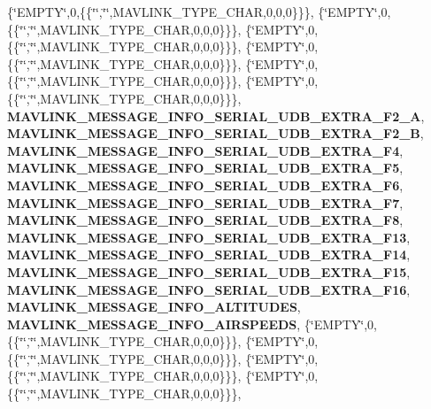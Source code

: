 \{\char`\"{}E\+M\+P\+TY\char`\"{},0,\{\{\char`\"{}\char`\"{},\char`\"{}\char`\"{},M\+A\+V\+L\+I\+N\+K\+\_\+\+T\+Y\+P\+E\+\_\+\+C\+H\+AR,0,0,0\}\}\}, \{\char`\"{}E\+M\+P\+TY\char`\"{},0,\{\{\char`\"{}\char`\"{},\char`\"{}\char`\"{},M\+A\+V\+L\+I\+N\+K\+\_\+\+T\+Y\+P\+E\+\_\+\+C\+H\+AR,0,0,0\}\}\}, \{\char`\"{}E\+M\+P\+TY\char`\"{},0,\{\{\char`\"{}\char`\"{},\char`\"{}\char`\"{},M\+A\+V\+L\+I\+N\+K\+\_\+\+T\+Y\+P\+E\+\_\+\+C\+H\+AR,0,0,0\}\}\}, \{\char`\"{}E\+M\+P\+TY\char`\"{},0,\{\{\char`\"{}\char`\"{},\char`\"{}\char`\"{},M\+A\+V\+L\+I\+N\+K\+\_\+\+T\+Y\+P\+E\+\_\+\+C\+H\+AR,0,0,0\}\}\}, \{\char`\"{}E\+M\+P\+TY\char`\"{},0,\{\{\char`\"{}\char`\"{},\char`\"{}\char`\"{},M\+A\+V\+L\+I\+N\+K\+\_\+\+T\+Y\+P\+E\+\_\+\+C\+H\+AR,0,0,0\}\}\}, \{\char`\"{}E\+M\+P\+TY\char`\"{},0,\{\{\char`\"{}\char`\"{},\char`\"{}\char`\"{},M\+A\+V\+L\+I\+N\+K\+\_\+\+T\+Y\+P\+E\+\_\+\+C\+H\+AR,0,0,0\}\}\}, \textbf{ M\+A\+V\+L\+I\+N\+K\+\_\+\+M\+E\+S\+S\+A\+G\+E\+\_\+\+I\+N\+F\+O\+\_\+\+S\+E\+R\+I\+A\+L\+\_\+\+U\+D\+B\+\_\+\+E\+X\+T\+R\+A\+\_\+\+F2\+\_\+A}, \textbf{ M\+A\+V\+L\+I\+N\+K\+\_\+\+M\+E\+S\+S\+A\+G\+E\+\_\+\+I\+N\+F\+O\+\_\+\+S\+E\+R\+I\+A\+L\+\_\+\+U\+D\+B\+\_\+\+E\+X\+T\+R\+A\+\_\+\+F2\+\_\+B}, \textbf{ M\+A\+V\+L\+I\+N\+K\+\_\+\+M\+E\+S\+S\+A\+G\+E\+\_\+\+I\+N\+F\+O\+\_\+\+S\+E\+R\+I\+A\+L\+\_\+\+U\+D\+B\+\_\+\+E\+X\+T\+R\+A\+\_\+\+F4}, \textbf{ M\+A\+V\+L\+I\+N\+K\+\_\+\+M\+E\+S\+S\+A\+G\+E\+\_\+\+I\+N\+F\+O\+\_\+\+S\+E\+R\+I\+A\+L\+\_\+\+U\+D\+B\+\_\+\+E\+X\+T\+R\+A\+\_\+\+F5}, \textbf{ M\+A\+V\+L\+I\+N\+K\+\_\+\+M\+E\+S\+S\+A\+G\+E\+\_\+\+I\+N\+F\+O\+\_\+\+S\+E\+R\+I\+A\+L\+\_\+\+U\+D\+B\+\_\+\+E\+X\+T\+R\+A\+\_\+\+F6}, \textbf{ M\+A\+V\+L\+I\+N\+K\+\_\+\+M\+E\+S\+S\+A\+G\+E\+\_\+\+I\+N\+F\+O\+\_\+\+S\+E\+R\+I\+A\+L\+\_\+\+U\+D\+B\+\_\+\+E\+X\+T\+R\+A\+\_\+\+F7}, \textbf{ M\+A\+V\+L\+I\+N\+K\+\_\+\+M\+E\+S\+S\+A\+G\+E\+\_\+\+I\+N\+F\+O\+\_\+\+S\+E\+R\+I\+A\+L\+\_\+\+U\+D\+B\+\_\+\+E\+X\+T\+R\+A\+\_\+\+F8}, \textbf{ M\+A\+V\+L\+I\+N\+K\+\_\+\+M\+E\+S\+S\+A\+G\+E\+\_\+\+I\+N\+F\+O\+\_\+\+S\+E\+R\+I\+A\+L\+\_\+\+U\+D\+B\+\_\+\+E\+X\+T\+R\+A\+\_\+\+F13}, \textbf{ M\+A\+V\+L\+I\+N\+K\+\_\+\+M\+E\+S\+S\+A\+G\+E\+\_\+\+I\+N\+F\+O\+\_\+\+S\+E\+R\+I\+A\+L\+\_\+\+U\+D\+B\+\_\+\+E\+X\+T\+R\+A\+\_\+\+F14}, \textbf{ M\+A\+V\+L\+I\+N\+K\+\_\+\+M\+E\+S\+S\+A\+G\+E\+\_\+\+I\+N\+F\+O\+\_\+\+S\+E\+R\+I\+A\+L\+\_\+\+U\+D\+B\+\_\+\+E\+X\+T\+R\+A\+\_\+\+F15}, \textbf{ M\+A\+V\+L\+I\+N\+K\+\_\+\+M\+E\+S\+S\+A\+G\+E\+\_\+\+I\+N\+F\+O\+\_\+\+S\+E\+R\+I\+A\+L\+\_\+\+U\+D\+B\+\_\+\+E\+X\+T\+R\+A\+\_\+\+F16}, \textbf{ M\+A\+V\+L\+I\+N\+K\+\_\+\+M\+E\+S\+S\+A\+G\+E\+\_\+\+I\+N\+F\+O\+\_\+\+A\+L\+T\+I\+T\+U\+D\+ES}, \textbf{ M\+A\+V\+L\+I\+N\+K\+\_\+\+M\+E\+S\+S\+A\+G\+E\+\_\+\+I\+N\+F\+O\+\_\+\+A\+I\+R\+S\+P\+E\+E\+DS}, \{\char`\"{}E\+M\+P\+TY\char`\"{},0,\{\{\char`\"{}\char`\"{},\char`\"{}\char`\"{},M\+A\+V\+L\+I\+N\+K\+\_\+\+T\+Y\+P\+E\+\_\+\+C\+H\+AR,0,0,0\}\}\}, \{\char`\"{}E\+M\+P\+TY\char`\"{},0,\{\{\char`\"{}\char`\"{},\char`\"{}\char`\"{},M\+A\+V\+L\+I\+N\+K\+\_\+\+T\+Y\+P\+E\+\_\+\+C\+H\+AR,0,0,0\}\}\}, \{\char`\"{}E\+M\+P\+TY\char`\"{},0,\{\{\char`\"{}\char`\"{},\char`\"{}\char`\"{},M\+A\+V\+L\+I\+N\+K\+\_\+\+T\+Y\+P\+E\+\_\+\+C\+H\+AR,0,0,0\}\}\}, \{\char`\"{}E\+M\+P\+TY\char`\"{},0,\{\{\char`\"{}\char`\"{},\char`\"{}\char`\"{},M\+A\+V\+L\+I\+N\+K\+\_\+\+T\+Y\+P\+E\+\_\+\+C\+H\+AR,0,0,0\}\}\}, 